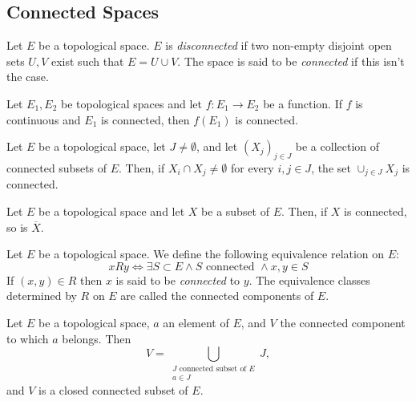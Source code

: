 \subsection{Connected Spaces}

\begin{definition}
	Let $E$ be a topological space. $E$ is \emph{disconnected} if two non-empty disjoint open sets $U,V$ exist such that $E = U \cup V$. The space is said to be \emph{connected} if this isn't the case.	
\end{definition}

\begin{theorem}
	Let $E_1, E_2$ be topological spaces and let $f : E_1 \to E_2$ be a function. If $f$ is continuous and $E_1$ is connected, then $f(E_1)$ is connected.
\end{theorem}

\begin{theorem}
	Let $E$ be a topological space, let $J \neq \emptyset$, and let $(X_j)_{j \in J}$ be a collection of connected subsets of $E$. Then, if $X_i \cap X_j \neq \emptyset$ for every $i,j \in J$, the set $\cup_{j \in J} X_j$ is connected.	
\end{theorem}

\begin{theorem}
Let $E$ be a topological space and let $X$ be a subset of $E$. Then, if $X$ is connected, so is $\overline X$.	
\end{theorem}

\begin{definition}
	Let $E$ be a topological space. We define the following equivalence relation on $E$:
	\begin{equation*}
		xRy \Leftrightarrow \exists S \subset E \land S \text{ connected } \land  x,y \in S	
	\end{equation*}
	If $(x,y) \in R$ then $x$ is said to be \emph{connected} to $y$. The equivalence classes determined by $R$ on $E$ are called the connected components of $E$.
\end{definition}

\begin{theorem}
	Let $E$ be a topological space, $a$ an element of $E$, and $V$ the connected component to which $a$ belongs. Then
	\begin{equation*}
		V = \bigcup_{\substack{J \text{ connected subset of } E \\ a \in J}} J,
	\end{equation*}
	and $V$ is a closed connected subset of $E$.
\end{theorem}

